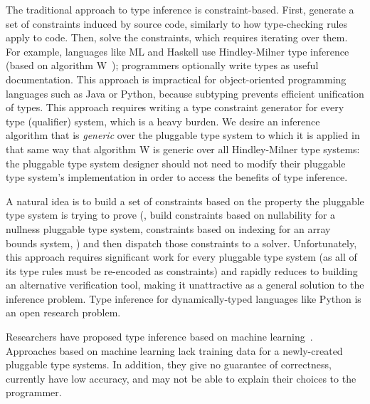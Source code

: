 The traditional approach to type inference is constraint-based.
First, generate a set of constraints induced by source code, similarly to
how type-checking rules apply to code.
Then, solve the constraints, which requires iterating over them.
%
For example, languages like ML and Haskell use
Hindley-Milner type inference (based on algorithm
W~\cite{DamasM1982}); programmers optionally write types
as useful documentation.
%
This approach is impractical for object-oriented programming
languages such as Java or Python, because subtyping prevents efficient
unification of types.
%
This approach requires writing a type constraint generator for every type
(qualifier) system, which is a heavy burden.
%
We desire an
inference algorithm that is \emph{generic} over the pluggable type system
to which it is applied in that same way that algorithm W is generic over
all Hindley-Milner type systems: the pluggable type system designer should not need to
modify their pluggable type system's implementation in order to access
the benefits of type inference.



A natural idea is to build a set of constraints based on the property the
pluggable type system is trying to prove (\eg, build constraints based on
nullability for a nullness pluggable type system, constraints based on indexing
for an array bounds system, \etc) and then dispatch those constraints
to a solver.
%
Unfortunately, this approach requires significant work for every pluggable type
system (as all of its type rules must be re-encoded as constraints) and rapidly
reduces to building an alternative verification tool, making it unattractive as
a general solution to the inference problem.
%
Type inference for dynamically-typed languages like Python is an open
research problem. 

Researchers have proposed type inference based on machine
learning~\cite{xu2016python,peng2022static}.  Approaches based on machine
learning lack training data for a newly-created pluggable type systems.  In
addition, they give no guarantee of correctness, currently have low
accuracy, and may not be able to explain their choices to the programmer.

